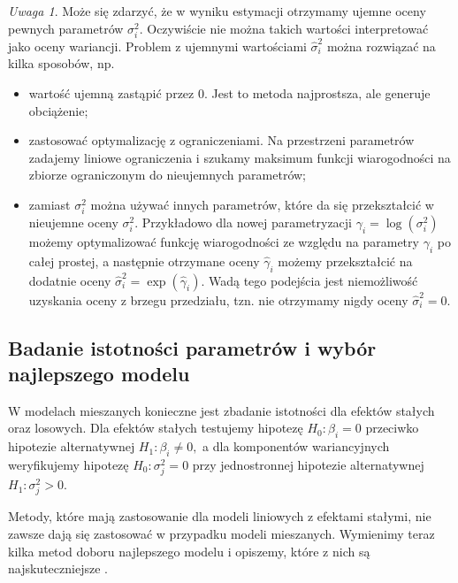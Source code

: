 \documentclass[12pt]{mwbk}
\theoremstyle{plain}
\theoremstyle{definition}
\theoremstyle{remark}
\newtheorem{uwaga}{Uwaga}[chapter]
\begin{document}
\begin{uwaga}
	Może się zdarzyć, że w wyniku estymacji otrzymamy ujemne oceny pewnych parametrów $\sigma_i^2$. Oczywiście nie można takich wartości interpretować jako oceny wariancji. Problem z ujemnymi wartościami $\hat{\sigma}^2_i$ można rozwiązać na kilka sposobów, np.
	\begin{itemize}
		\item wartość ujemną zastąpić przez 0. Jest to metoda najprostsza, ale generuje obciążenie;
		\item zastosować optymalizację z ograniczeniami. Na przestrzeni parametrów zadajemy liniowe ograniczenia i szukamy maksimum funkcji wiarogodności na zbiorze ograniczonym do nieujemnych parametrów;
		\item zamiast $\sigma_i^2$ można używać innych parametrów, które da się przekształcić w nieujemne oceny $\sigma^2_i$. Przykładowo dla nowej parametryzacji $\gamma_i=\log(\sigma^2_i)$ możemy optymalizować funkcję wiarogodności ze względu na parametry $\gamma_i$ po całej prostej, a następnie otrzymane oceny $\hat{\gamma}_i$ możemy przekształcić na dodatnie oceny $\hat{\sigma}_i^2=\exp(\hat{\gamma}_i)$. Wadą tego podejścia jest niemożliwość uzyskania oceny z brzegu przedziału, tzn. nie otrzymamy nigdy oceny $\hat{\sigma}^2_i=0$.
	\end{itemize}
\end{uwaga}

\subsection{Badanie istotności parametrów i wybór najlepszego modelu}

W modelach mieszanych konieczne jest zbadanie istotności dla efektów stałych oraz losowych. Dla efektów stałych testujemy hipotezę $H_0: \beta_i=0$ przeciwko hipotezie alternatywnej $H_1: \beta_i \neq 0,$ a dla komponentów wariancyjnych weryfikujemy hipotezę $H_0: \sigma^2_j=0$ przy jednostronnej hipotezie alternatywnej  $H_1: \sigma^2_j>0.$ 



Metody, które mają zastosowanie dla modeli liniowych z efektami stałymi, nie zawsze dają się zastosować w przypadku modeli mieszanych. Wymienimy teraz kilka metod doboru najlepszego modelu i opiszemy, które z nich są najskuteczniejsze \cite{faraway}.
\end{document}
